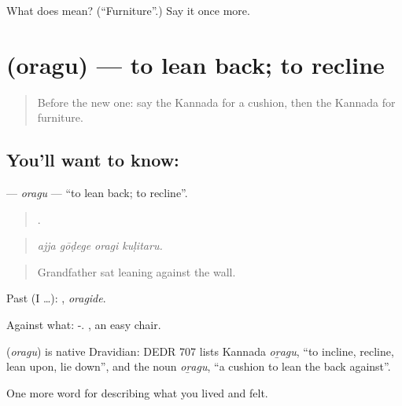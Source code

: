 \begin{tcolorbox}[breakable,colback=teal!4,colframe=teal!35!black,title={Before you move on}]
What does  mean? (\textquotedblleft{}Furniture\textquotedblright{}.) Say it once more.
\end{tcolorbox}
\section[\texorpdfstring{\kn{ಒರಗು} (oragu)}{ಒರಗು (oragu)}]{ (oragu) — to lean back; to recline}

\label{lesson:KA-C543-oragu}



\begin{quote}
Before the new one: say the Kannada for a cushion, then the Kannada for furniture.
\end{quote}

\subsection*{You'll want to know: }
\textbf{} — \emph{oragu} — \textquotedblleft{}to lean back; to recline\textquotedblright{}.

\begin{quote}
   .
\end{quote}

\begin{quote}
\emph{ajja gōḍege oragi kuḷitaru.}
\end{quote}

\begin{quote}
Grandfather sat leaning against the wall.
\end{quote}

Past (I …): , \emph{oragide}.

Against what: -.  , an easy chair.

\begin{cousinweb}
\textbf{} (\emph{oragu}) is native Dravidian: DEDR 707 lists Kannada \emph{oṟagu}, \textquotedblleft{}to incline, recline, lean upon, lie down\textquotedblright{}, and the noun \emph{oṟagu}, \textquotedblleft{}a cushion to lean the back against\textquotedblright{}.
\end{cousinweb}

\begin{grammarlens}[title={What you've built}]
One more word for describing what you lived and felt.
\end{grammarlens}

